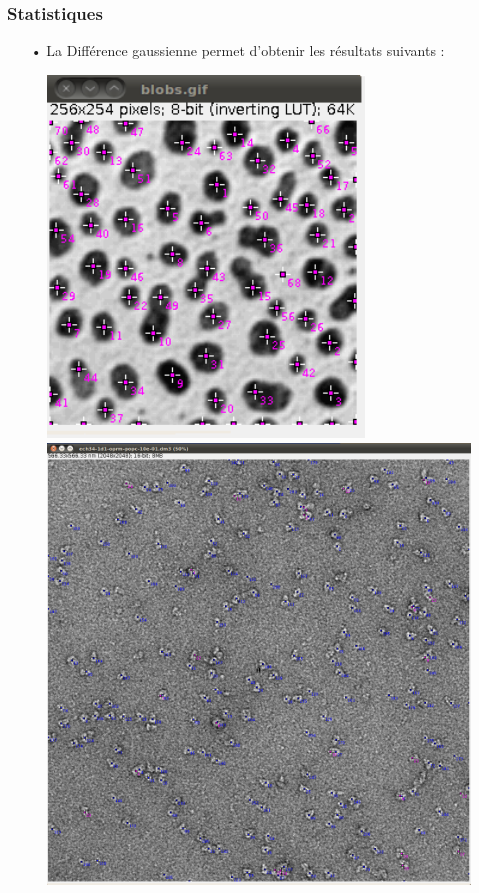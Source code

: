 \subsubsection*{Statistiques}

\begin{itemize}
\item[•] La Différence gaussienne permet d'obtenir les résultats suivants :
\end{itemize}

\begin{figure}[!ht]
\begin{center}
 \begin{minipage}{.450\linewidth}
  \includegraphics[width=0.75\textwidth]{blobsDog.png}  
 \end{minipage} \hfill
\begin{minipage}{.450\linewidth}
  \includegraphics[width=1\textwidth]{protDog.png}   

\end{minipage}
\end{center}
\end{figure}
